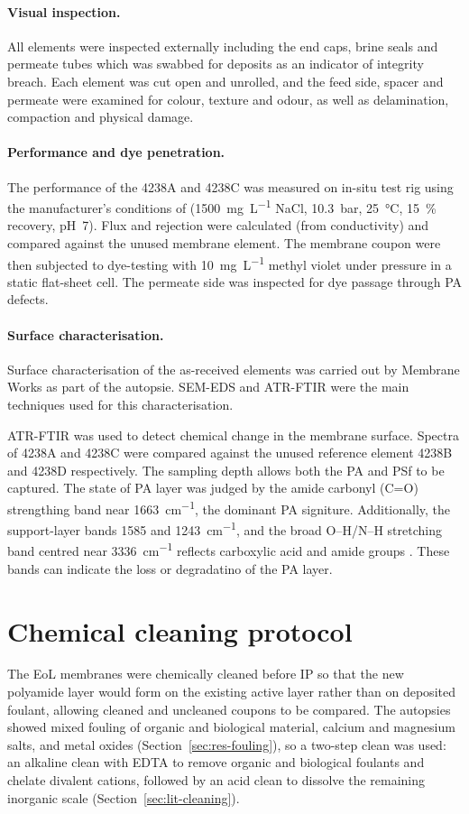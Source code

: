 \paragraph{Visual inspection.}
All elements were inspected externally including the end caps, brine seals and permeate tubes which was swabbed for deposits as an indicator of integrity breach. Each element was cut open and unrolled, and the feed side, spacer and permeate were examined for colour, texture and odour, as well as delamination, compaction and physical damage. 

\paragraph{Performance and dye penetration.}
The performance of the 4238A and 4238C was measured on in-situ test rig using the manufacturer's conditions of (\qty{1500}{mg.L^{-1}} NaCl, \qty{10.3}{bar}, \qty{25}{\celsius}, \qty{15}{\percent} recovery, pH~7). Flux and rejection were calculated (from conductivity) and compared against the unused membrane element. The membrane coupon were then subjected to dye-testing with \qty{10}{mg.L^{-1}} methyl violet under pressure in a static flat-sheet cell. The permeate side was inspected for dye passage through PA defects. 

\paragraph{Surface characterisation.}
Surface characterisation of the as-received elements was carried out by Membrane Works as part of the autopsie. SEM-EDS and ATR-FTIR were the main techniques used for this characterisation. 


ATR-FTIR was used to detect chemical change in the membrane surface. Spectra of 4238A and 4238C were compared against the unused reference element 4238B and 4238D respectively. The sampling depth allows both the PA and PSf to be captured. The state of PA layer was judged by the amide carbonyl (C=O) strengthing band near \qty{1663}{cm^{-1}}, the dominant PA signiture. Additionally, the support-layer bands \qty{1585}{} and \qty{1243}{cm^{-1}}, and the broad O--H/N--H stretching band centred near \qty{3336}{cm^{-1}} reflects carboxylic acid and amide groups \citep{Ogbe2025}. These bands can indicate the loss or degradatino of the PA layer. 


\section{Chemical cleaning protocol}
\label{sec:cleaning}
The EoL membranes were chemically cleaned before IP so that the new polyamide layer would form on the existing active layer rather than on deposited foulant, allowing cleaned and uncleaned coupons to be compared. The autopsies showed mixed fouling of organic and biological material, calcium and magnesium salts, and metal oxides (Section~\ref{sec:res-fouling}), so a two-step clean was used: an alkaline clean with EDTA to remove organic and biological foulants and chelate divalent cations, followed by an acid clean to dissolve the remaining inorganic scale (Section~\ref{sec:lit-cleaning}).

